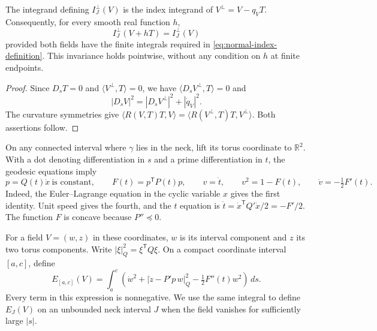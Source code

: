\begin{lemma}\label{lem:tangential-invariance}
The integrand defining $I_J^\perp(V)$ is the index integrand of
$V^\perp=V-q_VT$.  Consequently, for every smooth real function $h$,
\[
 I_J^\perp(V+hT)=I_J^\perp(V)
\]
provided both fields have the finite integrals required in
\eqref{eq:normal-index-definition}.  This invariance holds pointwise, without
any condition on $h$ at finite endpoints.
\end{lemma}

\begin{proof}
Since $D_sT=0$ and $\langle V^\perp,T\rangle=0$, we have
$\langle D_sV^\perp,T\rangle=0$ and
\[
 |D_sV|^2=|D_sV^\perp|^2+|\dot q_V|^2.
\]
The curvature symmetries give
$\langle R(V,T)T,V\rangle=
\langle R(V^\perp,T)T,V^\perp\rangle$.
Both assertions follow.
\end{proof}

On any connected interval where $\gamma$ lies in the neck, lift its torus
coordinate to $\mathbb R^2$.  With a dot denoting differentiation in $s$ and
a prime differentiation in $t$, the geodesic equations imply
\begin{equation}\label{eq:neck-geodesic}
 p=Q(t)\dot x\ \text{is constant},\qquad
 F(t)=p^{\mathsf T}P(t)p,\qquad
 v=\dot t,\qquad
 v^2=1-F(t),\qquad \dot v=-\tfrac12F'(t).
\end{equation}
Indeed, the Euler--Lagrange equation in the cyclic variable $x$ gives the
first identity.  Unit speed gives the fourth, and the $t$ equation is
$\ddot t=\dot x^{\mathsf T}Q'\dot x/2=-F'/2$.
The function $F$ is concave because $P''\preceq0$.

For a field $V=(w,z)$ in these coordinates, $w$ is its interval component
and $z$ its two torus components.  Write $|\xi|_Q^2=\xi^{\mathsf T}Q\xi$.
On a compact coordinate interval $[a,c]$, define
\begin{equation}\label{eq:linear-energy}
 E_{[a,c]}(V)=\int_a^c
 \left(\dot w^2+|\dot z-P'p\,w|_Q^2
                 -\tfrac12F''(t)w^2\right)\,ds.
\end{equation}
Every term in this expression is nonnegative. We use the same integral
to define $E_J(V)$ on an unbounded neck interval $J$ when the field
vanishes for sufficiently large $|s|$.

